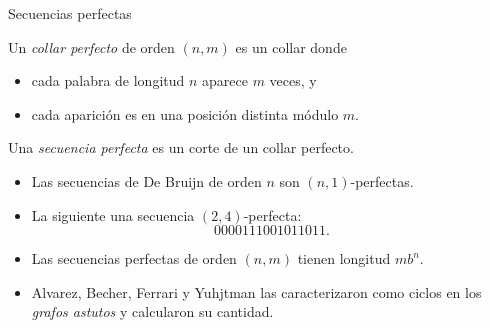 \documentclass[spanish,xcolor={table}]{beamer}
\begin{document}

\begin{frame}{Secuencias perfectas}
  \begin{definition}
    Un \emph{collar perfecto} de orden $(n,m)$ es un collar donde
    \begin{itemize}
      \item cada palabra de longitud $n$ aparece $m$ veces, y
      \item cada aparición es en una posición distinta módulo $m$.
    \end{itemize}
    \medskip
    Una \emph{secuencia perfecta} es un corte de un collar perfecto.
  \end{definition}
  \pause
  
  \begin{examples}
    \begin{itemize}
      \item Las secuencias de De Bruijn de orden $n$ son $(n,1)$-perfectas.
      \item La siguiente una secuencia $(2,4)$-perfecta: \vspace{-.5em}
      \[ 0000111001011011. \]
    \end{itemize}
  \end{examples}
  \pause

  \begin{itemize}
    \item Las secuencias perfectas de orden $(n,m)$ tienen longitud $mb^n$.
    \pause
    \item Alvarez, Becher, Ferrari y Yuhjtman las caracterizaron como ciclos
    en los \emph{grafos astutos} y calcularon su cantidad.
  \end{itemize}
  
\end{frame}

\end{document}
